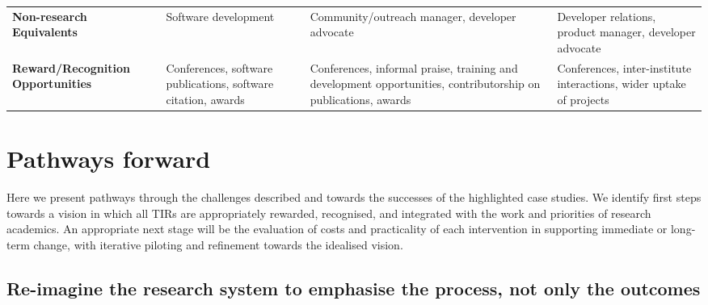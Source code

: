 \documentclass[authordate,meta]{jote-new-article}
\begin{document}
\begin{table*}[t]
\begin{fullwidth}
\begin{tabularx}{\linewidth}{@{} >{\arraybackslash\raggedright}X >{\arraybackslash\raggedright}X >{\arraybackslash\raggedright}X X @{}}
      \textbf{Non-research Equivalents}            & Software development                                                                                                 & Community/outreach manager, developer advocate
                                                   & Developer relations, product manager, developer advocate                                                                                                              \\

      \textbf{Reward/Recognition Opportunities}    & Conferences, software publications, software citation, awards
                                                   & Conferences, informal praise, training and development opportunities, contributorship on publications, awards
                                                   & Conferences, inter-institute interactions, wider uptake of projects                                                                                                   \\
    \end{tabularx}
  \end{fullwidth}
\end{table*}









\section{Pathways forward}



Here we present pathways through the challenges described and towards the successes of the highlighted case studies. We identify first steps towards a vision in which all TIRs are appropriately rewarded, recognised, and integrated with the work and priorities of research academics. An appropriate next stage will be the evaluation of costs and practicality of each intervention in supporting immediate or long-term change, with iterative piloting and refinement towards the idealised vision.







\subsection{Re-imagine the research system to emphasise the process, not only the outcomes}
\end{document}
